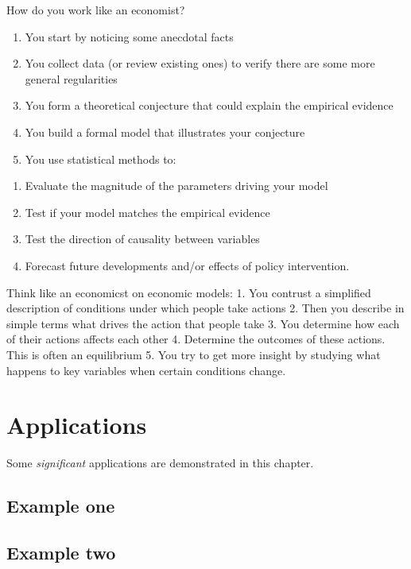\documentclass[
]{book}
\providecommand{\tightlist}{%
  \setlength{\itemsep}{0pt}\setlength{\parskip}{0pt}}
\begin{document}
How do you work like an economist?

\begin{enumerate}
\def\labelenumi{\arabic{enumi}.}
\tightlist
\item
  You start by noticing some anecdotal facts
\item
  You collect data (or review existing ones) to verify there are some more general regularities
\item
  You form a theoretical conjecture that could explain the empirical evidence
\item
  You build a formal model that illustrates your conjecture
\item
  You use statistical methods to:
\end{enumerate}

\begin{enumerate}
\def\labelenumi{\alph{enumi})}
\tightlist
\item
  Evaluate the magnitude of the parameters driving your model
\item
  Test if your model matches the empirical evidence
\item
  Test the direction of causality between variables
\item
  Forecast future developments and/or effects of policy intervention.
\end{enumerate}

Think like an economicst on economic models:
1. You contrust a simplified description of conditions under which people take actions
2. Then you describe in simple terms what drives the action that people take
3. You determine how each of their actions affects each other
4. Determine the outcomes of these actions. This is often an equilibrium
5. You try to get more insight by studying what happens to key variables when certain conditions change.

\hypertarget{applications}{%
\chapter{Applications}\label{applications}}

Some \emph{significant} applications are demonstrated in this chapter.

\hypertarget{example-one}{%
\section{Example one}\label{example-one}}

\hypertarget{example-two}{%
\section{Example two}\label{example-two}}
\end{document}
